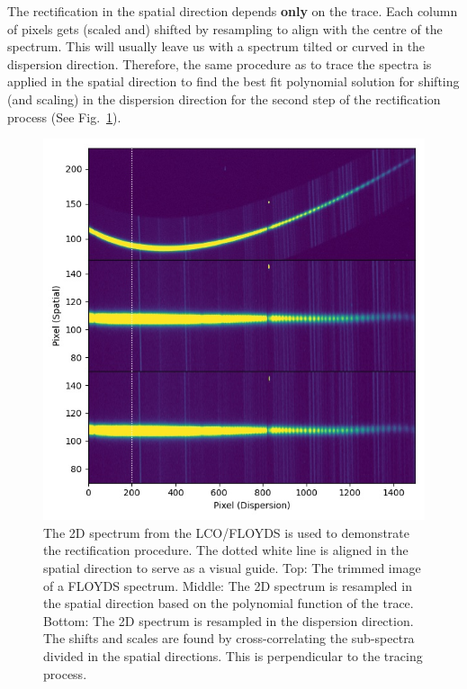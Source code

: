 \documentclass[fleqn,usenatbib]{mnras}
\begin{document}
The rectification in the spatial direction depends \textbf{only}
on the trace. Each column of pixels gets (scaled and) shifted by
resampling to align with the centre of the spectrum. This will
usually leave us with a spectrum tilted or curved in the dispersion
direction. Therefore, the same procedure as to trace the spectra is
applied in the spatial direction to find the best fit polynomial
solution for shifting (and scaling) in the dispersion direction for
the second step of the rectification process (See Fig.~\ref{fig:rectify}).

\begin{figure}
    \centering
    \includegraphics[width=\columnwidth]{fig_02_rectification.jpg}
    \caption{The 2D spectrum from the LCO/FLOYDS is used to
    demonstrate the rectification procedure. The dotted white line
    is aligned in the spatial direction to serve as a visual guide.
    Top: The trimmed image of a FLOYDS spectrum. Middle: The 2D
    spectrum is resampled in the spatial direction based on the
    polynomial function of the trace. Bottom: The 2D spectrum is
    resampled in the dispersion direction. The shifts and scales
    are found by cross-correlating the sub-spectra divided in the
    spatial directions. This is perpendicular to the tracing process.}
    \label{fig:rectify}
\end{figure}
\end{document}
